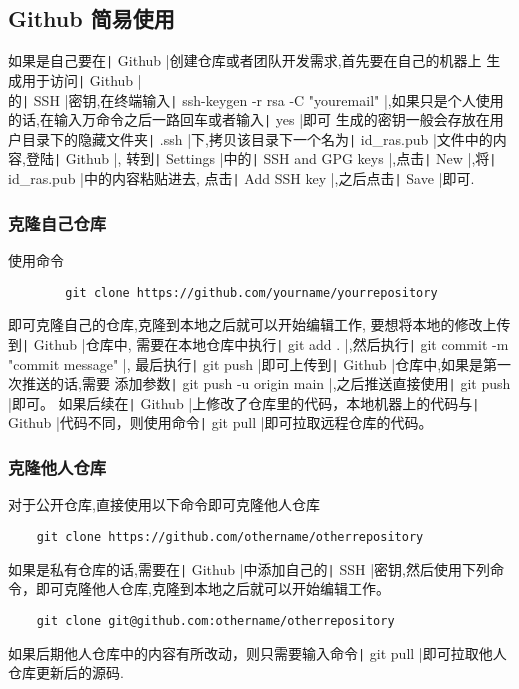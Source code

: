 \documentclass{article}
\newcommand\mintbash[1]{\texttt| #1 |}
\newcommand\bash[1]{\texttt| #1 |}
\begin{document}
\begin{appendices}
    \subsection{Github 简易使用}
    如果是自己要在\mintbash{Github}创建仓库或者团队开发需求,首先要在自己的机器上
    生成用于访问\mintbash{Github}\\的\mintbash{SSH}密钥,在终端输入\mintbash{ssh-keygen -r rsa -C "youremail"},如果只是个人使用的话,在输入万命令之后一路回车或者输入\mintbash{yes}即可
    生成的密钥一般会存放在用户目录下的隐藏文件夹\mintbash{.ssh}下,拷贝该目录下一个名为\mintbash{id_ras.pub}文件中的内容,登陆\mintbash{Github},
    转到\mintbash{Settings}中的\mintbash{SSH and GPG keys},点击\mintbash{New},将\mintbash{id_ras.pub}中的内容粘贴进去,
    点击\mintbash{Add SSH key},之后点击\mintbash{Save}即可.
    \subsubsection{克隆自己仓库}
    使用命令
    \begin{verbatim}
        git clone https://github.com/yourname/yourrepository
    \end{verbatim}
    即可克隆自己的仓库,克隆到本地之后就可以开始编辑工作,
    要想将本地的修改上传到\mintbash{Github}仓库中,
    需要在本地仓库中执行\mintbash{git add .},然后执行\mintbash{git commit -m "commit message"},
    最后执行\mintbash{git push}即可上传到\mintbash{Github}仓库中,如果是第一次推送的话,需要
    添加参数\mintbash{git push -u origin main},之后推送直接使用\mintbash{git push}即可。
    如果后续在\bash{Github}上修改了仓库里的代码，本地机器上的代码与\bash{Github}代码不同，则使用命令\bash{git pull}即可拉取远程仓库的代码。
    
    \subsubsection{克隆他人仓库}对于公开仓库,直接使用以下命令即可克隆他人仓库
    \begin{verbatim}
    git clone https://github.com/othername/otherrepository
\end{verbatim}
    如果是私有仓库的话,需要在\mintbash{Github}中添加自己的\mintbash{SSH}密钥,然后使用下列命令，即可克隆他人仓库,克隆到本地之后就可以开始编辑工作。
    \begin{verbatim}
    git clone git@github.com:othername/otherrepository
    \end{verbatim}
    如果后期他人仓库中的内容有所改动，则只需要输入命令\bash{git pull}即可拉取他人仓库更新后的源码.

\end{appendices}
\end{document}
